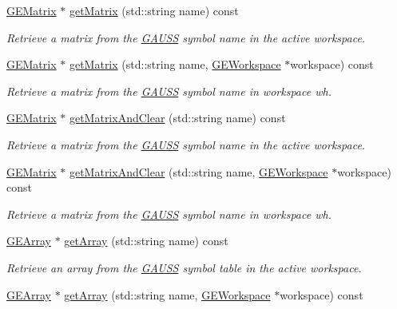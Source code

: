 \begin{DoxyCompactItemize}
\hyperlink{class_g_e_matrix}{G\+E\+Matrix} $\ast$ \hyperlink{class_g_a_u_s_s_a6bdba33e9ed8d7925a4d3578a64e8abb}{get\+Matrix} (std\+::string name) const
\begin{DoxyCompactList}\small\item\em Retrieve a matrix from the \hyperlink{class_g_a_u_s_s}{G\+A\+U\+SS} symbol name in the active workspace. \end{DoxyCompactList}\item 
\hyperlink{class_g_e_matrix}{G\+E\+Matrix} $\ast$ \hyperlink{class_g_a_u_s_s_a1345134e60c448c96d166049b71ce4a2}{get\+Matrix} (std\+::string name, \hyperlink{class_g_e_workspace}{G\+E\+Workspace} $\ast$workspace) const
\begin{DoxyCompactList}\small\item\em Retrieve a matrix from the \hyperlink{class_g_a_u_s_s}{G\+A\+U\+SS} symbol name in workspace {\itshape wh}. \end{DoxyCompactList}\item 
\hyperlink{class_g_e_matrix}{G\+E\+Matrix} $\ast$ \hyperlink{class_g_a_u_s_s_ad3561d1293dfe4af5336488b6d9a26f1}{get\+Matrix\+And\+Clear} (std\+::string name) const
\begin{DoxyCompactList}\small\item\em Retrieve a matrix from the \hyperlink{class_g_a_u_s_s}{G\+A\+U\+SS} symbol name in the active workspace. \end{DoxyCompactList}\item 
\hyperlink{class_g_e_matrix}{G\+E\+Matrix} $\ast$ \hyperlink{class_g_a_u_s_s_a0e770eaeebc8cd3c95ad52883b9f08df}{get\+Matrix\+And\+Clear} (std\+::string name, \hyperlink{class_g_e_workspace}{G\+E\+Workspace} $\ast$workspace) const
\begin{DoxyCompactList}\small\item\em Retrieve a matrix from the \hyperlink{class_g_a_u_s_s}{G\+A\+U\+SS} symbol name in workspace {\itshape wh}. \end{DoxyCompactList}\item 
\hyperlink{class_g_e_array}{G\+E\+Array} $\ast$ \hyperlink{class_g_a_u_s_s_ac3ed9591543f48d8b3096a96cfd8d9b9}{get\+Array} (std\+::string name) const
\begin{DoxyCompactList}\small\item\em Retrieve an array from the \hyperlink{class_g_a_u_s_s}{G\+A\+U\+SS} symbol table in the active workspace. \end{DoxyCompactList}\item 
\hyperlink{class_g_e_array}{G\+E\+Array} $\ast$ \hyperlink{class_g_a_u_s_s_a78f51d30372b96121792390d37ecbaab}{get\+Array} (std\+::string name, \hyperlink{class_g_e_workspace}{G\+E\+Workspace} $\ast$workspace) const

\end{DoxyCompactItemize}
